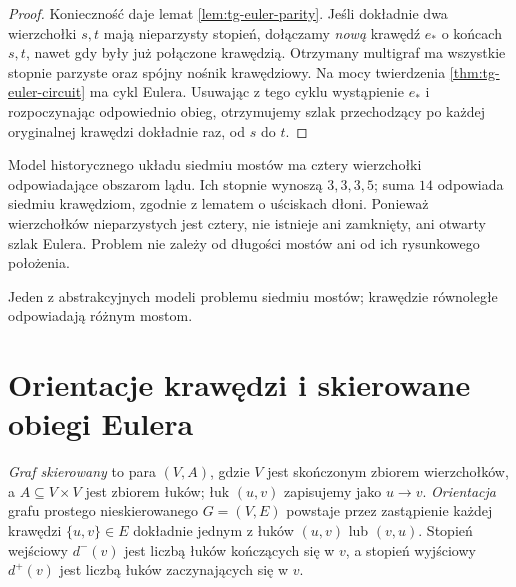 \begin{proof}
Konieczność daje lemat \ref{lem:tg-euler-parity}.
Jeśli dokładnie dwa wierzchołki $s,t$ mają nieparzysty
stopień, dołączamy \emph{nową} krawędź $e_*$ o końcach $s,t$,
nawet gdy były już połączone krawędzią. Otrzymany multigraf
ma wszystkie stopnie parzyste oraz spójny nośnik krawędziowy.
Na mocy twierdzenia \ref{thm:tg-euler-circuit} ma cykl Eulera.
Usuwając z tego cyklu wystąpienie $e_*$ i rozpoczynając
odpowiednio obieg, otrzymujemy szlak przechodzący po każdej
oryginalnej krawędzi dokładnie raz, od $s$ do $t$.
\end{proof}

\begin{przyklad}
Model historycznego układu siedmiu mostów ma cztery
wierzchołki odpowiadające obszarom lądu. Ich stopnie
wynoszą $3,3,3,5$; suma $14$ odpowiada siedmiu krawędziom,
zgodnie z lematem o uściskach dłoni. Ponieważ wierzchołków
nieparzystych jest cztery, nie istnieje ani zamknięty,
ani otwarty szlak Eulera. Problem nie zależy od długości
mostów ani od ich rysunkowego położenia.
\end{przyklad}

\begin{center}

{\footnotesize Jeden z abstrakcyjnych modeli problemu siedmiu mostów;
krawędzie równoległe odpowiadają różnym mostom.}
\end{center}

\section{Orientacje krawędzi i skierowane obiegi Eulera}
\label{sec:tg-orientacje}

\begin{definicja}
\emph{Graf skierowany} to para $(V,A)$, gdzie $V$ jest
skończonym zbiorem wierzchołków, a $A\subseteq V\times V$
jest zbiorem łuków; łuk $(u,v)$ zapisujemy jako $u\to v$.
\emph{Orientacja} grafu prostego nieskierowanego $G=(V,E)$
powstaje przez zastąpienie każdej krawędzi $\{u,v\}\in E$
dokładnie jednym z łuków $(u,v)$ lub $(v,u)$.
Stopień wejściowy $d^-(v)$ jest liczbą łuków kończących się
w $v$, a stopień wyjściowy $d^+(v)$ jest liczbą łuków
zaczynających się w $v$.
\end{definicja}

